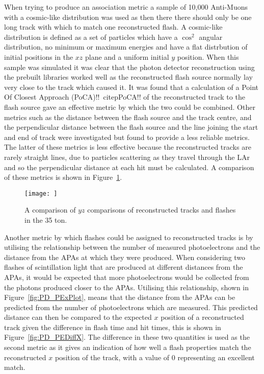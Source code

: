 When trying to produce an association metric a sample of 10,000 Anti-Muons with a cosmic-like distribution was used as then there there should only be one long track with which to match one reconstructed flash. A cosmic-like distribution is defined as a set of particles which have a $\cos^{2}$ angular distribution, no minimum or maximum energies and have a flat distrbution of initial positions in the $xz$ plane and a uniform initial $y$ position. When this sample was simulated it was clear that the photon detector reconstruction using the prebuilt libraries worked well as the reconstructed flash source normally lay very close to the track which caused it. It was found that a calculation of a Point Of Closest Approach (PoCA)!!~citep{PoCA}!! of the reconstructed track to the flash source gave an effective metric by which the two could be combined. Other metrics such as the distance between the flash source and the track centre, and the perpendicular distance between the flash source and the line joining the start and end of track were investigated but found to provide a less reliable metrics. The latter of these metrics is less effective because the reconstructed tracks are rarely straight lines, due to particles scattering as they travel through the LAr and so the perpendicular distance at each hit must be calculated. A comparison of these metrics is shown in Figure~\ref{fig:PDYZDist}. \\

\begin{figure}[h!]
  \centering
  \texttt{[image: ]}
  \caption[Matching tracks and flashes in the 35 ton using positions in the $yz$ plane]
          {A comparison of $yz$ comparisons of reconstructed tracks and flashes in the 35 ton.}
  \label{fig:PDYZDist}
\end{figure}

Another metric by which flashes could be assigned to reconstructed tracks is by utilising the relationship between the number of measured photoelectrons and the distance from the APAs at which they were produced. When considering two flashes of scintillation light that are produced at different distances from the APAs, it would be expected that more photoelectrons would be collected from the photons produced closer to the APAs. Utilising this relationship, shown in Figure~\ref{fig:PD_PExPlot}, means that the distance from the APAs can be predicted from the number of photoelectrons which are measured. This predicted distance can then be compared to the expected $x$ position of a reconstructed track given the difference in flash time and hit times, this is shown in Figure~\ref{fig:PD_PEDiffX}. The difference in these two quantities is used as the second metric as it gives an indication of how well a flash properties match the reconstructed $x$ position of the track, with a value of 0 representing an excellent match. \\

